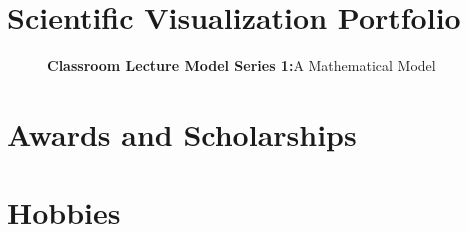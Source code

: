 \documentclass{ResumeDesignFormat1}
\begin{document}
\section{Scientific Visualization Portfolio}

\begin{enumerate}
\end{enumerate}
\footnotesize
\begin{figure}[h]
\centering
\caption{\textcolor{c5}{\textbf{Classroom Lecture Model Series 1:}}\footnotesize  A Mathematical Model}
\label{fig:Figure1}
\end{figure}

\section{Awards and Scholarships}

\begin{enumerate}
\end{enumerate}
\section{Hobbies}

\begin{enumerate}
\end{enumerate}
\end{document}
